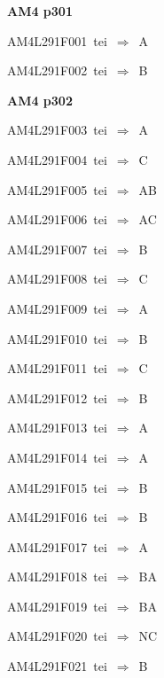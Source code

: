 \par\vfill\eject
{\bf\hfill AM4 p301\hfill\hbox{}}\par\bigskip
{\sixrm AM4L291F001\ {\sixit tei}\ }$\Rightarrow$\ {\tenit A}\par\smallskip
{\sixrm AM4L291F002\ {\sixit tei}\ }$\Rightarrow$\ {\tenit B}\par\smallskip

\par\vfill\eject
{\bf\hfill AM4 p302\hfill\hbox{}}\par\bigskip
{\sixrm AM4L291F003\ {\sixit tei}\ }$\Rightarrow$\ {\tenit A}\par\smallskip
{\sixrm AM4L291F004\ {\sixit tei}\ }$\Rightarrow$\ {\tenit C}\par\smallskip
{\sixrm AM4L291F005\ {\sixit tei}\ }$\Rightarrow$\ AB\par\smallskip
{\sixrm AM4L291F006\ {\sixit tei}\ }$\Rightarrow$\ AC\par\smallskip
{\sixrm AM4L291F007\ {\sixit tei}\ }$\Rightarrow$\ {\tenit B}\par\smallskip
{\sixrm AM4L291F008\ {\sixit tei}\ }$\Rightarrow$\ {\tenit C}\par\smallskip
{\sixrm AM4L291F009\ {\sixit tei}\ }$\Rightarrow$\ A\par\smallskip
{\sixrm AM4L291F010\ {\sixit tei}\ }$\Rightarrow$\ B\par\smallskip
{\sixrm AM4L291F011\ {\sixit tei}\ }$\Rightarrow$\ C\par\smallskip
{\sixrm AM4L291F012\ {\sixit tei}\ }$\Rightarrow$\ {\tenit B}\par\smallskip
{\sixrm AM4L291F013\ {\sixit tei}\ }$\Rightarrow$\ {\tenit A}\par\smallskip
{\sixrm AM4L291F014\ {\sixit tei}\ }$\Rightarrow$\ A\par\smallskip
{\sixrm AM4L291F015\ {\sixit tei}\ }$\Rightarrow$\ B\par\smallskip
{\sixrm AM4L291F016\ {\sixit tei}\ }$\Rightarrow$\ B\par\smallskip
{\sixrm AM4L291F017\ {\sixit tei}\ }$\Rightarrow$\ A\par\smallskip
{\sixrm AM4L291F018\ {\sixit tei}\ }$\Rightarrow$\ BA\par\smallskip
{\sixrm AM4L291F019\ {\sixit tei}\ }$\Rightarrow$\ BA\par\smallskip
{\sixrm AM4L291F020\ {\sixit tei}\ }$\Rightarrow$\ NC\par\smallskip
{\sixrm AM4L291F021\ {\sixit tei}\ }$\Rightarrow$\ B\par\smallskip
